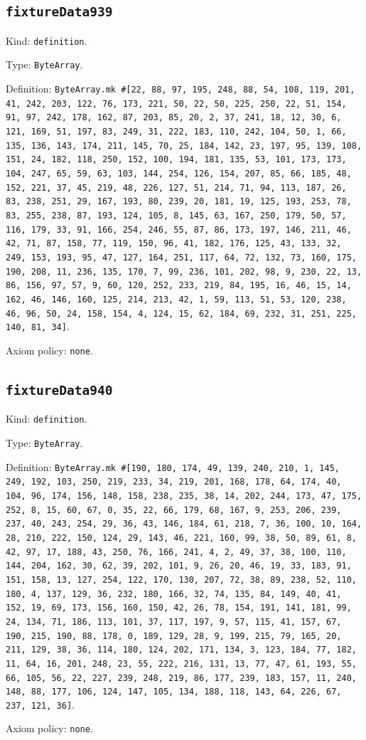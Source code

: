 \documentclass[11pt]{article}
\begin{document}
\subsection*{\texttt{fixtureData939}}
\noindent Kind: \texttt{definition}.\par
\noindent Type: \texttt{ByteArray}.\par
\noindent Definition: \texttt{ByteArray.mk \#[22, 88, 97, 195, 248, 88, 54, 108, 119, 201, 41, 242, 203, 122, 76, 173, 221, 50, 22, 50, 225, 250, 22, 51, 154, 91, 97, 242, 178, 162, 87, 203, 85, 20, 2, 37, 241, 18, 12, 30, 6, 121, 169, 51, 197, 83, 249, 31, 222, 183, 110, 242, 104, 50, 1, 66, 135, 136, 143, 174, 211, 145, 70, 25, 184, 142, 23, 197, 95, 139, 108, 151, 24, 182, 118, 250, 152, 100, 194, 181, 135, 53, 101, 173, 173, 104, 247, 65, 59, 63, 103, 144, 254, 126, 154, 207, 85, 66, 185, 48, 152, 221, 37, 45, 219, 48, 226, 127, 51, 214, 71, 94, 113, 187, 26, 83, 238, 251, 29, 167, 193, 80, 239, 20, 181, 19, 125, 193, 253, 78, 83, 255, 238, 87, 193, 124, 105, 8, 145, 63, 167, 250, 179, 50, 57, 116, 179, 33, 91, 166, 254, 246, 55, 87, 86, 173, 197, 146, 211, 46, 42, 71, 87, 158, 77, 119, 150, 96, 41, 182, 176, 125, 43, 133, 32, 249, 153, 193, 95, 47, 127, 164, 251, 117, 64, 72, 132, 73, 160, 175, 190, 208, 11, 236, 135, 170, 7, 99, 236, 101, 202, 98, 9, 230, 22, 13, 86, 156, 97, 57, 9, 60, 120, 252, 233, 219, 84, 195, 16, 46, 15, 14, 162, 46, 146, 160, 125, 214, 213, 42, 1, 59, 113, 51, 53, 120, 238, 46, 96, 50, 24, 158, 154, 4, 124, 15, 62, 184, 69, 232, 31, 251, 225, 140, 81, 34]}.\par
\noindent Axiom policy: \texttt{none}.\par
\subsection*{\texttt{fixtureData940}}
\noindent Kind: \texttt{definition}.\par
\noindent Type: \texttt{ByteArray}.\par
\noindent Definition: \texttt{ByteArray.mk \#[190, 180, 174, 49, 139, 240, 210, 1, 145, 249, 192, 103, 250, 219, 233, 34, 219, 201, 168, 178, 64, 174, 40, 104, 96, 174, 156, 148, 158, 238, 235, 38, 14, 202, 244, 173, 47, 175, 252, 8, 15, 60, 67, 0, 35, 22, 66, 179, 68, 167, 9, 253, 206, 239, 237, 40, 243, 254, 29, 36, 43, 146, 184, 61, 218, 7, 36, 100, 10, 164, 28, 210, 222, 150, 124, 29, 143, 46, 221, 160, 99, 38, 50, 89, 61, 8, 42, 97, 17, 188, 43, 250, 76, 166, 241, 4, 2, 49, 37, 38, 100, 110, 144, 204, 162, 30, 62, 39, 202, 101, 9, 26, 20, 46, 19, 33, 183, 91, 151, 158, 13, 127, 254, 122, 170, 130, 207, 72, 38, 89, 238, 52, 110, 180, 4, 137, 129, 36, 232, 180, 166, 32, 74, 135, 84, 149, 40, 41, 152, 19, 69, 173, 156, 160, 150, 42, 26, 78, 154, 191, 141, 181, 99, 24, 134, 71, 186, 113, 101, 37, 117, 197, 9, 57, 115, 41, 157, 67, 190, 215, 190, 88, 178, 0, 189, 129, 28, 9, 199, 215, 79, 165, 20, 211, 129, 38, 36, 114, 180, 124, 202, 171, 134, 3, 123, 184, 77, 182, 11, 64, 16, 201, 248, 23, 55, 222, 216, 131, 13, 77, 47, 61, 193, 55, 66, 105, 56, 22, 227, 239, 248, 219, 86, 177, 239, 183, 157, 11, 240, 148, 88, 177, 106, 124, 147, 105, 134, 188, 118, 143, 64, 226, 67, 237, 121, 36]}.\par
\noindent Axiom policy: \texttt{none}.\par
\end{document}
